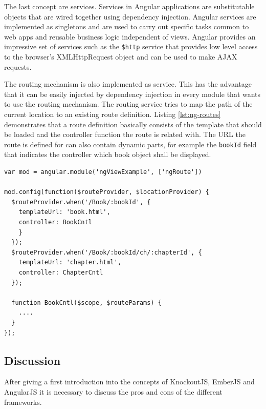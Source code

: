 The last concept are services.
Services in Angular applications are substitutable objects that are wired together using dependency injection. Angular services are implemented as singletons and are used to carry out specific tasks common to web apps and reusable business logic independent of views. Angular provides an impressive set of services such as the \texttt{\$http} service that provides low level access to the browser's XMLHttpRequest object and can be used to make AJAX requests.

The routing mechanism is also implemented as service. This has the advantage that it can be easily injected by dependency injection in every module that wants to use the routing mechanism. 
The routing service tries to map the path of the current location to an existing route definition. Listing \ref{lst:ng-routes} demonstrates that a route definition basically consists of the template that should be loaded and the controller function the route is related with. 
The URL the route is defined for can also contain dynamic parts, for example the \texttt{bookId} field that indicates the controller which book object shall be displayed.

\begin{lstlisting}[label=lst:ng-routes,caption=Route definition in AngularJS]
var mod = angular.module('ngViewExample', ['ngRoute'])
 
mod.config(function($routeProvider, $locationProvider) {
  $routeProvider.when('/Book/:bookId', {
    templateUrl: 'book.html',
    controller: BookCntl
    }
  });
  $routeProvider.when('/Book/:bookId/ch/:chapterId', {
    templateUrl: 'chapter.html',
    controller: ChapterCntl
  });
  
  function BookCntl($scope, $routeParams) {
	....
  }
});
\end{lstlisting}

\subsection{Discussion} \label{chap:fw-discussion}


After giving a first introduction into the concepts of KnockoutJS, EmberJS and AngularJS it is necessary to discuss the pros and cons of the different frameworks.

